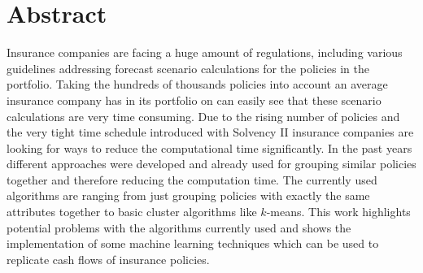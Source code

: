 

\chapter*{Abstract}
\label{cha:abstract}


Insurance companies are facing a huge amount of regulations, including various guidelines addressing forecast scenario calculations for the policies in the portfolio. Taking the hundreds of thousands policies into account an average insurance company has in its portfolio on can easily see that these scenario calculations are very time consuming. Due to the rising number of policies and the very tight time schedule introduced with Solvency II insurance companies are looking for ways to reduce the computational time significantly. In the past years different approaches were developed and already used for grouping similar policies together and therefore reducing the computation time. The currently used algorithms are ranging from just grouping policies with exactly the same attributes together to basic cluster algorithms like $k$-means. This work highlights potential problems with the algorithms currently used and shows the implementation of some machine learning techniques which can be used to replicate cash flows of insurance policies. 
